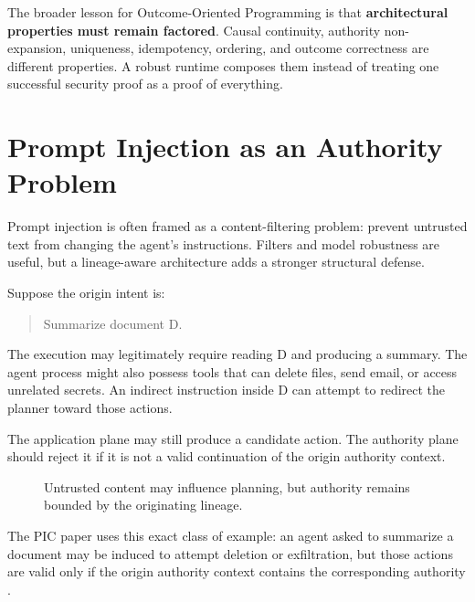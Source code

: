 \documentclass[10pt,oneside,openany]{book}
\begin{document}
The broader lesson for Outcome-Oriented Programming is that \textbf{architectural properties must remain factored}. Causal continuity, authority non-expansion, uniqueness, idempotency, ordering, and outcome correctness are different properties. A robust runtime composes them instead of treating one successful security proof as a proof of everything.

\chapter{Prompt Injection as an Authority Problem}

Prompt injection is often framed as a content-filtering problem: prevent untrusted text from changing the agent's instructions. Filters and model robustness are useful, but a lineage-aware architecture adds a stronger structural defense.

Suppose the origin intent is:

\begin{quote}
Summarize document D.
\end{quote}

The execution may legitimately require reading D and producing a summary. The agent process might also possess tools that can delete files, send email, or access unrelated secrets. An indirect instruction inside D can attempt to redirect the planner toward those actions.

The application plane may still produce a candidate action. The authority plane should reject it if it is not a valid continuation of the origin authority context.

\begin{figure}[ht]
\centering
{}
\caption{Untrusted content may influence planning, but authority remains bounded by the originating lineage.}
\end{figure}

The PIC paper uses this exact class of example: an agent asked to summarize a document may be induced to attempt deletion or exfiltration, but those actions are valid only if the origin authority context contains the corresponding authority \cite{gallo2026pic}.
\end{document}
